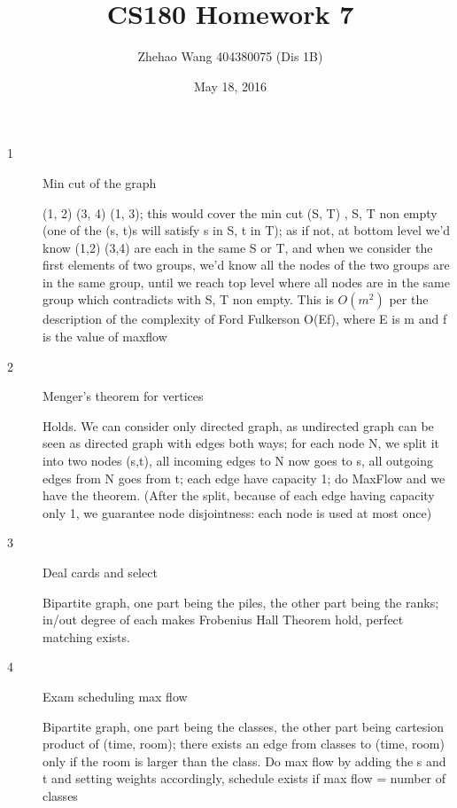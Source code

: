 \documentclass{article}
\title{CS180 Homework 7}
\author{Zhehao Wang 404380075 (Dis 1B)}
\date{May 18, 2016}
\begin{document}
\maketitle

\begin{description}

\item[1]{Min cut of the graph}
  
  (1, 2) (3, 4) (1, 3); this would cover the min cut (S, T) , S, T non empty (one of the (s, t)s will satisfy s in S, t in T); as if not, at bottom level we'd know (1,2) (3,4) are each in the same S or T, and when we consider the first elements of two groups, we'd know all the nodes of the two groups are in the same group, until we reach top level where all nodes are in the same group which contradicts with S, T non empty.
  This is $O(m^2)$ per the description of the complexity of Ford Fulkerson O(Ef), where E is m and f is the value of maxflow
  
\item[2]{Menger's theorem for vertices}
  
  Holds. We can consider only directed graph, as undirected graph can be seen as directed graph with edges both ways; for each node N, we split it into two nodes (s,t), all incoming edges to N now goes to s, all outgoing edges from N goes from t; each edge have capacity 1; do MaxFlow and we have the theorem. (After the split, because of each edge having capacity only 1, we guarantee node disjointness: each node is used at most once)

\item[3]{Deal cards and select}
 
  Bipartite graph, one part being the piles, the other part being the ranks; in/out degree of each makes Frobenius Hall Theorem hold, perfect matching exists.

\item[4]{Exam scheduling max flow}

  Bipartite graph, one part being the classes, the other part being cartesion product of (time, room); there exists an edge from classes to (time, room) only if the room is larger than the class. Do max flow by adding the s and t and setting weights accordingly, schedule exists if max flow = number of classes

\end{description}
\end{document}
